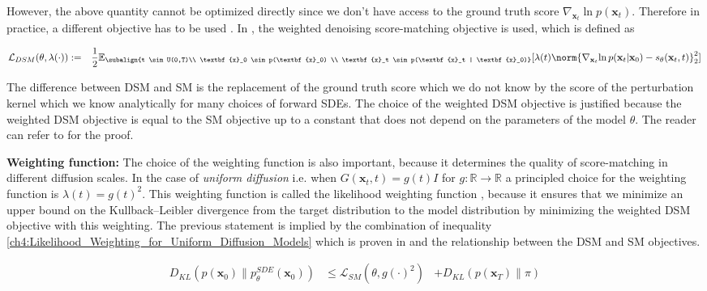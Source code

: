However, the above quantity cannot be optimized directly since we don't have access to the ground truth score $\nabla_{\textbf{x}_t}{\ln{p(\textbf{x}_t)}}$. Therefore in practice, a different objective has to be used \cite{score_matching, vincent2011connection, song2020score}. In \cite{song2020score}, the weighted denoising score-matching objective is used, which is defined as 

\begin{gather}\label{ch4:DSM_for_uniform_diffusion_models}
\begin{aligned}
    &\mathcal{L}_{DSM}(\theta, \lambda(\cdot)) := 
    &\frac{1}{2} \mathbb{E}_{\subalign{t \sim U(0,T)\\ \textbf{x}_0 \sim p(\textbf{x}_0) \\ \textbf{x}_t \sim p(\textbf{x}_t | \textbf{x}_0)}} [\lambda(t) \norm{\nabla_{\textbf{x}_t}{\ln{p(\textbf{x}_t | \textbf{x}_0)}} - s_\theta(\textbf{x}_t,t)}_2^2]
\end{aligned}
\end{gather}

The difference between DSM and SM is the replacement of the ground truth score which we do not know by the score of the perturbation kernel which we know analytically for many choices of forward SDEs. The choice of the weighted DSM objective is justified because the weighted DSM objective is equal to the SM objective up to a constant that does not depend on the parameters of the model $\theta$. The reader can refer to \cite{vincent2011connection} for the proof. 

\textbf{Weighting function:} The choice of the weighting function is also important, because it determines the quality of score-matching in different diffusion scales. In the case of \textit{uniform diffusion} i.e.  when $G(\textbf{x}_t,t) = g(t) I$ for $g: \mathbb{R} \xrightarrow{} \mathbb{R}$ a principled choice for the weighting function is $\lambda(t) = g(t)^2$. This weighting function is called the likelihood weighting function \cite{song2021maximum}, because it ensures that we minimize an upper bound on the Kullback–Leibler divergence from the target distribution to the model distribution by minimizing the weighted DSM objective with this weighting. The previous statement is implied by the combination of inequality \ref{ch4:Likelihood_Weighting_for_Uniform_Diffusion_Models} which is proven in \cite{song2021maximum} and the relationship between the DSM and SM objectives.

\begin{equation}\label{ch4:Likelihood_Weighting_for_Uniform_Diffusion_Models}
\begin{aligned}
    D_{KL}(p(\textbf{x}_0)\parallel p^{SDE}_{\theta}(\textbf{x}_0)) &\leq    \mathcal{L}_{SM}(\theta, g(\cdot)^2) & + D_{KL}(p(\textbf{x}_T)\parallel \pi)
\end{aligned}
\end{equation}

